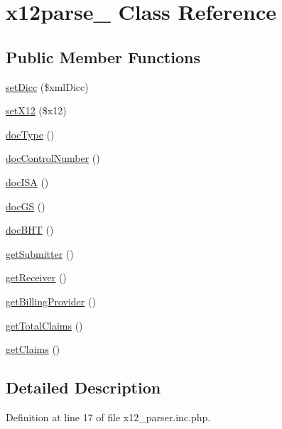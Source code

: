\hypertarget{classx12parse__4010}{\section{x12parse\-\_ \-Class \-Reference}
\label{classx12parse__4010}
}
\subsection*{\-Public \-Member \-Functions}
\begin{DoxyCompactItemize}
\item 
\hyperlink{classx12parse__4010_a83c964e6cb221f88505d2ff119bdd641}{set\-Dicc} (\$xml\-Dicc)
\item 
\hyperlink{classx12parse__4010_ace453e85f1cfba709fc4cbcae9bbd8ff}{set\-X12} (\$x12)
\item 
\hyperlink{classx12parse__4010_afdf85651bb162c7b0993960a9c987584}{doc\-Type} ()
\item 
\hyperlink{classx12parse__4010_a8ca165bd1c22338f8e66fc83e4d22291}{doc\-Control\-Number} ()
\item 
\hyperlink{classx12parse__4010_ae29dd8ca5c5bfd894f4929e263f5027a}{doc\-I\-S\-A} ()
\item 
\hyperlink{classx12parse__4010_a2caa4dcf32ee20e5efd0602345addfef}{doc\-G\-S} ()
\item 
\hyperlink{classx12parse__4010_a5e3231f83aa98d105346f4027dd4826f}{doc\-B\-H\-T} ()
\item 
\hyperlink{classx12parse__4010_aea59e05b79461e1bcf064f2484e29d18}{get\-Submitter} ()
\item 
\hyperlink{classx12parse__4010_accb00daf426085c20ac5581f66fa1bd7}{get\-Receiver} ()
\item 
\hyperlink{classx12parse__4010_a1ebef5e6d721d58af40e0252a6882c40}{get\-Billing\-Provider} ()
\item 
\hyperlink{classx12parse__4010_a0a074b2d3ba9c397036fe8b8be4f06dd}{get\-Total\-Claims} ()
\item 
\hyperlink{classx12parse__4010_aded8dd7a693f28c58fddfae7c6912842}{get\-Claims} ()
\end{DoxyCompactItemize}


\subsection{\-Detailed \-Description}


\-Definition at line 17 of file x12\-\_\-parser.\-inc.\-php.



